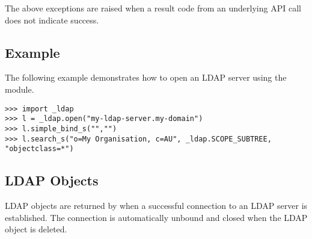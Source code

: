 The above exceptions are raised when a result code from an underlying API
call does not indicate success.

%



\subsection{Example \label{ldap-example}}

The following example demonstrates how to open an LDAP server using the
 module.

\begin{verbatim}
>>> import _ldap
>>> l = _ldap.open("my-ldap-server.my-domain")
>>> l.simple_bind_s("","")
>>> l.search_s("o=My Organisation, c=AU", _ldap.SCOPE_SUBTREE, "objectclass=*")
\end{verbatim}


\subsection{LDAP Objects}
\label{ldap-objects}

LDAP objects are returned by  when a successful
connection to an LDAP server is established.
The connection is automatically unbound and closed 
when the LDAP object is deleted.

